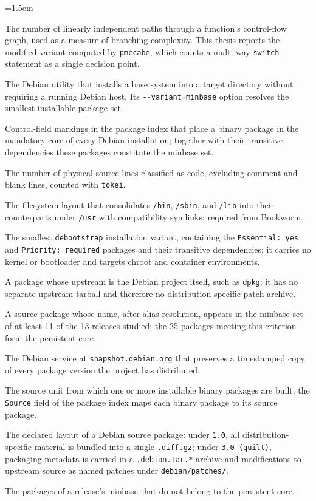 \begingroup
\emergencystretch=1.5em
\begin{description}[itemsep=2pt]
    \item[cyclomatic complexity] The number of linearly independent paths through a function's control-flow graph, used as a measure of branching complexity. This thesis reports the modified variant computed by \texttt{pmccabe}, which counts a multi-way \texttt{switch} statement as a single decision point.
    \item[\texttt{debootstrap}] The Debian utility that installs a base system into a target directory without requiring a running Debian host. Its \texttt{-{}-variant=minbase} option resolves the smallest installable package set.
    \item[\texttt{Essential} / \texttt{Priority: required}] Control-field markings in the package index that place a binary package in the mandatory core of every Debian installation; together with their transitive dependencies these packages constitute the minbase set.
    \item[lines of code (NLOC)] The number of physical source lines classified as code, excluding comment and blank lines, counted with \texttt{tokei}.
    \item[merged-\texttt{/usr}] The filesystem layout that consolidates \texttt{/bin}, \texttt{/sbin}, and \texttt{/lib} into their counterparts under \texttt{/usr} with compatibility symlinks; required from Bookworm.
    \item[minbase] The smallest \texttt{debootstrap} installation variant, containing the \texttt{Essential: yes} and \texttt{Priority: required} packages and their transitive dependencies; it carries no kernel or bootloader and targets chroot and container environments.
    \item[native package] A package whose upstream is the Debian project itself, such as \texttt{dpkg}; it has no separate upstream tarball and therefore no distribution-specific patch archive.
    \item[persistent package] A source package whose name, after alias resolution, appears in the minbase set of at least 11 of the 13 releases studied; the 25 packages meeting this criterion form the persistent core.
    \item[snapshot archive] The Debian service at \texttt{snapshot.debian.org} that preserves a timestamped copy of every package version the project has distributed.
    \item[source package / binary package] The source unit from which one or more installable binary packages are built; the \texttt{Source} field of the package index maps each binary package to its source package.
    \item[source-package format] The declared layout of a Debian source package: under \texttt{1.0}, all distribution-specific material is bundled into a single \texttt{.diff.gz}; under \texttt{3.0 (quilt)}, packaging metadata is carried in a \texttt{.debian.tar.*} archive and modifications to upstream source as named patches under \texttt{debian/patches/}.
    \item[transient set] The packages of a release's minbase that do not belong to the persistent core.
\end{description}
\endgroup
